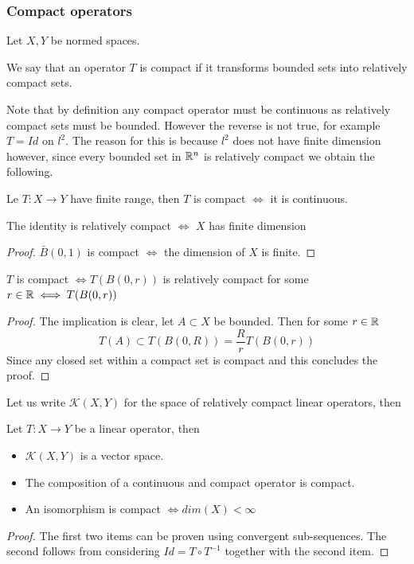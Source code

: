 \documentclass[
    a4paper,
    DIV=14,
    abstract=true,
    numbers=noenddot
]{scrartcl}
\begin{document}
\subsubsection{Compact operators}
Let $X,Y$ be normed spaces.
\begin{definition}
	We say that an operator $T$ is compact if it transforms bounded sets into relatively compact sets.
\end{definition}
Note that by definition any compact operator must be continuous as relatively compact sets must be bounded. However the reverse is not true, for example $T=Id$ on $l^2$. The reason for this is because $l^2$ does not have finite dimension however, since every bounded set in $\mathbb{R}^n$ is relatively compact we obtain the following.
\begin{proposition}
	Le $T:X\to Y$ have finite range, then $T$ is compact $\iff$ it is continuous.
\end{proposition}
\begin{proposition}
	The identity is relatively compact $\iff$ $X$ has finite dimension
\end{proposition}
\begin{proof}
	$\bar{B}(0,1)$ is compact $\iff$ the dimension of $X$ is finite.
\end{proof}
\begin{proposition}
	$T$ is compact $\iff T(B(0,r))$ is relatively compact for some $r\in\mathbb{R}\iff T(B(0,r))$
\end{proposition}
\begin{proof}
	The implication is clear, let $A\subset X$ be bounded. Then for some $r\in\mathbb{R}$
	\begin{equation*}
		T(A)\subset T(B(0,R))=\frac{R}{r} T(B(0,r))
	\end{equation*}
	Since any closed set within a compact set is compact and this concludes the proof.
\end{proof}
Let us write $\mathcal{K}(X,Y)$ for the space of relatively compact linear operators, then
\begin{proposition}
	Let $T:X\to Y$ be a linear operator, then
	\begin{itemize}
		\item $\mathcal{K}(X,Y)$ is a vector space.
		\item The composition of a continuous and compact operator is compact.
		\item An isomorphism is compact $\iff dim(X)<\infty$
	\end{itemize}
\end{proposition}
\begin{proof}
	The first two items can be proven using convergent sub-sequences. The second follows from considering $Id=T\circ T^{-1}$ together with the second item.
\end{proof}
\end{document}
